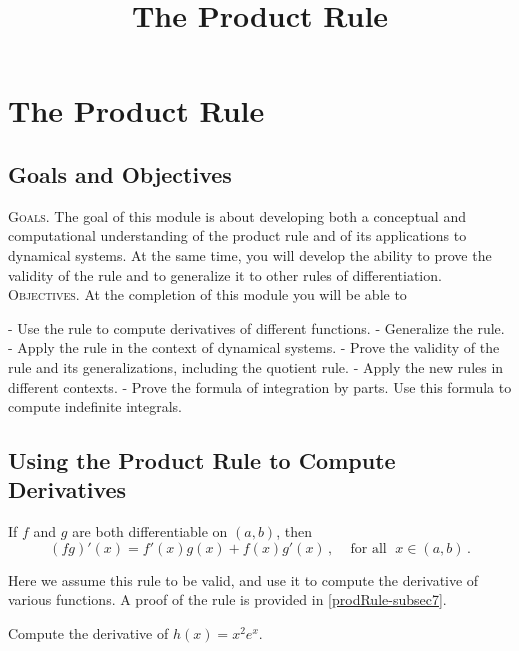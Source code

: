 \documentclass{ximera}
\title{The Product Rule}
\begin{document}
\maketitle
 
 \setcounter{chapter}{3}
\setcounter{section}{1}
\section{The Product Rule}
\subsection*{Goals and Objectives}

\textsc{Goals.} The goal of this module is about developing both a conceptual and computational understanding of the product rule and of its applications to dynamical systems. At the same time, you will develop the ability to prove the validity of the rule and to generalize it to other rules of differentiation.
\\

\noindent \textsc{Objectives.} At the completion of this module you will be able to

- Use the rule to compute derivatives of different functions.
- Generalize the rule.
- Apply the rule in the context of dynamical systems.
- Prove the validity of the rule and its generalizations, including the quotient rule.
- Apply the new rules in different contexts.
- Prove the formula of integration by parts. Use this formula to compute indefinite integrals.





\subsection{Using the Product Rule to Compute Derivatives}\label{prodRule-subsec1}

\begin{theorem} If \(f\) and \(g\) are both differentiable on \((a,b)\), then
 \[(f g)'(x)= f'(x) g(x)+ f(x) g'(x)\,,  \;\;\;  \text{ for all } \; x \in (a,b)\,.\]
\end{theorem}
Here we assume this rule to be valid, and use it to compute the derivative of various functions. A proof of the rule is provided in \ref{prodRule-subsec7}.


\begin{example} \rm{Compute the derivative of \(h(x)=x^2 e^x\). }\label{productRule-1-ex01}\end{example}
\end{document}
